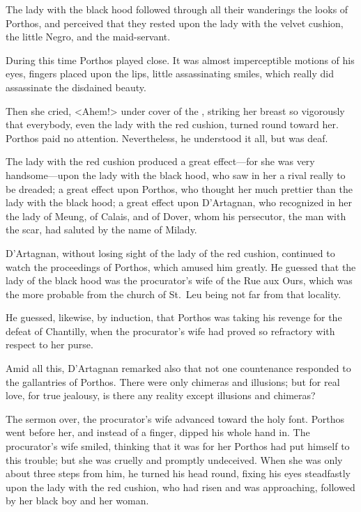 The lady with the black hood followed through all their wanderings the looks of Porthos, and perceived that they rested upon the lady with the velvet cushion, the little Negro, and the maid-servant. 

During this time Porthos played close. It was almost imperceptible motions of his eyes, fingers placed upon the lips, little assassinating smiles, which really did assassinate the disdained beauty. 

Then she cried, <Ahem!> under cover of the , striking her breast so vigorously that everybody, even the lady with the red cushion, turned round toward her. Porthos paid no attention. Nevertheless, he understood it all, but was deaf. 

The lady with the red cushion produced a great effect—for she was very handsome—upon the lady with the black hood, who saw in her a rival really to be dreaded; a great effect upon Porthos, who thought her much prettier than the lady with the black hood; a great effect upon D'Artagnan, who recognized in her the lady of Meung, of Calais, and of Dover, whom his persecutor, the man with the scar, had saluted by the name of Milady. 

D'Artagnan, without losing sight of the lady of the red cushion, continued to watch the proceedings of Porthos, which amused him greatly. He guessed that the lady of the black hood was the procurator's wife of the Rue aux Ours, which was the more probable from the church of St.~Leu being not far from that locality. 

He guessed, likewise, by induction, that Porthos was taking his revenge for the defeat of Chantilly, when the procurator's wife had proved so refractory with respect to her purse. 

Amid all this, D'Artagnan remarked also that not one countenance responded to the gallantries of Porthos. There were only chimeras and illusions; but for real love, for true jealousy, is there any reality except illusions and chimeras? 

The sermon over, the procurator's wife advanced toward the holy font. Porthos went before her, and instead of a finger, dipped his whole hand in. The procurator's wife smiled, thinking that it was for her Porthos had put himself to this trouble; but she was cruelly and promptly undeceived. When she was only about three steps from him, he turned his head round, fixing his eyes steadfastly upon the lady with the red cushion, who had risen and was approaching, followed by her black boy and her woman. 

